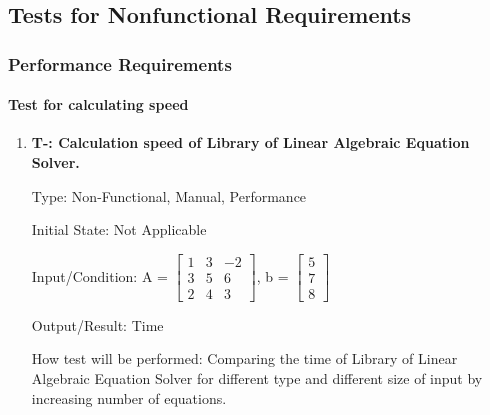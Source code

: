 \documentclass[12pt, titlepage]{article}
\newcounter{tnum}
\begin{document}

\subsection{Tests for Nonfunctional Requirements}

\subsubsection{Performance Requirements}
		
\paragraph{Test for calculating speed}

\begin{enumerate}

\item{\textbf{T-\thetnum \label{t-speed}: Calculation speed
of Library of Linear Algebraic Equation Solver.}}


Type: Non-Functional, Manual, Performance
					
Initial State: Not Applicable
					
Input/Condition: A = $\begin{bmatrix} 
1 & 3 & -2 \\
3 & 5 & 6\\
2 & 4 & 3
\end{bmatrix}$, b = $\begin{bmatrix} 
5\\
7\\
8 
\end{bmatrix}$
					
Output/Result: Time
					
How test will be performed: Comparing the time of Library of Linear Algebraic
Equation Solver for different type and different size of input by increasing
number of equations.
					

\end{enumerate}
\end{document}

